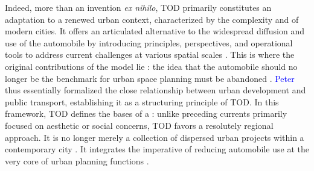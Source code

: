 \begin{refsegment}
Indeed, more than an invention \textsl{ex nihilo}, \acrshort{TOD} primarily constitutes an adaptation to a renewed urban context, characterized by the complexity and  of modern cities. It offers an articulated alternative to the widespread diffusion and use of the automobile by introducing principles, perspectives, and operational tools to address current challenges at various spatial scales \textcolor{blue}{\autocite[37]{leysens_reconfiguration_2011}}. This is where the original contributions of the model lie \textcolor{blue}{\autocite[121]{lo_feudo_scenario_2014}}: the idea that the automobile should no longer be the benchmark for urban space planning must be abandoned \textcolor{blue}{\autocite[190]{ducharme_ville_2021}}. \textcolor{blue}{Peter} \textcolor{blue}{\textcite{calthorpe_next_1993}} thus essentially formalized the close relationship between urban development and public transport, establishing it as a structuring principle of \acrshort{TOD}. In this framework, \acrshort{TOD} defines the bases of a : unlike preceding currents primarily focused on aesthetic or social concerns, \acrshort{TOD} favors a resolutely regional approach. It is no longer merely a collection of dispersed urban projects within a contemporary city \textcolor{blue}{\autocite[357]{mongin_ville_2013}}. It integrates the imperative of reducing automobile use at the very core of urban planning functions \textcolor{blue}{\autocite[11]{calthorpe_next_1993}}.%


\end{refsegment}
